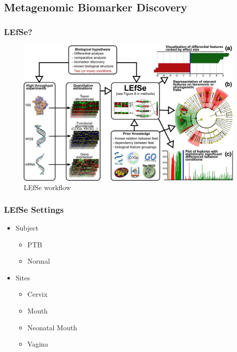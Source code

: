 \documentclass{beamer}
\begin{document}
    \subsection{Metagenomic Biomarker Discovery}
    \begin{frame}
        \frametitle{LEfSe?}

        \begin{figure}
            \includegraphics[width=0.6 \linewidth]{figures/LEfSe.jpg}
            \caption{LEfSe workflow \protect\cite{lefse1}}
        \end{figure}
    \end{frame}

    \begin{frame}
        \frametitle{LEfSe Settings}

        \begin{itemize}
            \item Subject
            \begin{itemize}
                \item PTB
                \item Normal
            \end{itemize}
            \item Sites
            \begin{itemize}
                \item Cervix
                \item Mouth
                \item Neonatal Mouth
                \item Vagina
            \end{itemize}
        \end{itemize}
    \end{frame}
\end{document}

